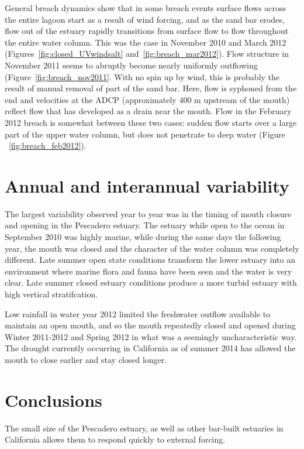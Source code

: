 General breach dynamics show that in some breach events surface flows across the entire lagoon start as a result of wind forcing, and as the sand bar erodes, flow out of the estuary rapidly transitions from surface flow to flow throughout the entire water column. This was the case in November 2010 and March 2012 (Figures~\ref{fig:closed_UVwindsalt} and~\ref{fig:breach_mar2012}). Flow structure in November 2011 seems to abruptly become nearly uniformly outflowing (Figure~\ref{fig:breach_nov2011}. With no spin up by wind, this is probably the result of manual removal of part of the sand bar. Here, flow is syphoned from the end and velocities at the ADCP (approximately 400 m upstream of the mouth) reflect flow that has developed as a drain near the mouth. Flow in the February 2012 breach is somewhat between these two cases: sudden flow starts over a large part of the upper water column, but does not penetrate to deep water (Figure ~\ref{fig:breach_feb2012}). 


\section{Annual and interannual variability} \label{sec:annvar}


The largest variability observed year to year was in the timing of mouth closure and opening in the Pescadero estuary. The estuary while open to the ocean in September 2010 was highly marine, while during the same days the following year, the mouth was closed and the character of the water column was completely different. Late summer open state conditions transform the lower estuary into an environment where marine flora and fauna have been seen and the water is very clear. Late summer closed estuary conditions produce a more turbid estuary with high vertical stratifcation. 

Low rainfall in water year 2012 limited the freshwater outflow available to maintain an open mouth, and so the mouth repeatedly closed and opened during Winter 2011-2012 and Spring 2012 in what was a seemingly uncharacteristic way. The drought currently occurring in California as of summer 2014 has allowed the mouth to close earlier and stay closed longer.


\section{Conclusions} \label{backofch2}
The small size of the Pescadero estuary, as well as other bar-built estuaries in California allows them to respond quickly to external forcing. 









